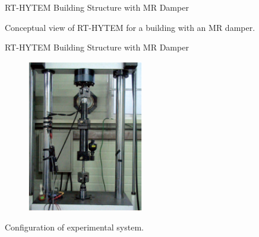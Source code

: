 \documentclass[usepdftitle=false]{beamer}
\begin{document}
\begin{frame}{RT-HYTEM Building Structure with MR Damper}
\begin{figure}[!ht]
\centering
\setcounter{subfigure}{0}
\label{fig:8-1}
\end{figure}
Conceptual view of RT-HYTEM for a building with an MR damper.
\end{frame}

\begin{frame}{RT-HYTEM Building Structure with MR Damper}
\begin{figure}[!ht]
\centering
\includegraphics[width=0.45\textwidth] {figure/8-2.eps}
\label{fig:8-2}
\end{figure}
Configuration of experimental system.
\end{frame}
\end{document}
